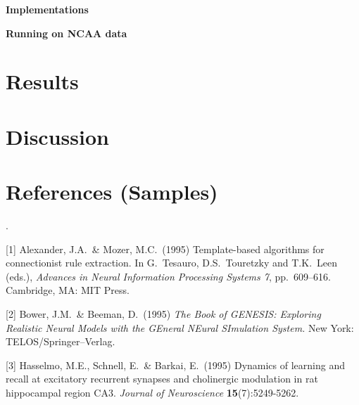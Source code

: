 \documentclass[12pt]{article}
\begin{document}
\textbf{Implementations}

\textbf{Running on NCAA data}



\section{Results}


\section{Discussion}



\section*{References (Samples)}
\qquad \qquad \qquad \qquad \qquad \qquad \qquad \qquad \qquad \qquad \qquad \qquad \qquad \qquad \qquad \qquad \qquad \qquad \qquad \qquad \qquad \qquad \qquad \qquad \qquad \qquad .
 
\small
[1] Alexander, J.A.\ \& Mozer, M.C.\ (1995) Template-based algorithms for
connectionist rule extraction. In G.\ Tesauro, D.S.\ Touretzky and T.K.\ Leen
(eds.), {\it Advances in Neural Information Processing Systems 7},
pp.\ 609--616. Cambridge, MA: MIT Press.

[2] Bower, J.M.\ \& Beeman, D.\ (1995) {\it The Book of GENESIS: Exploring
  Realistic Neural Models with the GEneral NEural SImulation System.}  New York:
TELOS/Springer--Verlag.

[3] Hasselmo, M.E., Schnell, E.\ \& Barkai, E.\ (1995) Dynamics of learning and
recall at excitatory recurrent synapses and cholinergic modulation in rat
hippocampal region CA3. {\it Journal of Neuroscience} {\bf 15}(7):5249-5262.
\end{document}
